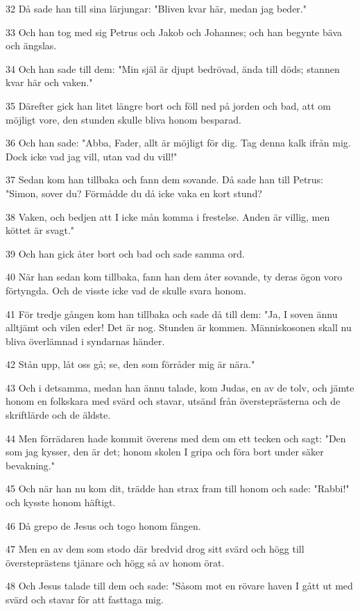 \par 32 Då sade han till sina lärjungar: "Bliven kvar här, medan jag beder."
\par 33 Och han tog med sig Petrus och Jakob och Johannes; och han begynte bäva och ängslas.
\par 34 Och han sade till dem: "Min själ är djupt bedrövad, ända till döds; stannen kvar här och vaken."
\par 35 Därefter gick han litet längre bort och föll ned på jorden och bad, att om möjligt vore, den stunden skulle bliva honom besparad.
\par 36 Och han sade: "Abba, Fader, allt är möjligt för dig. Tag denna kalk ifrån mig. Dock icke vad jag vill, utan vad du vill!"
\par 37 Sedan kom han tillbaka och fann dem sovande. Då sade han till Petrus: "Simon, sover du? Förmådde du då icke vaka en kort stund?
\par 38 Vaken, och bedjen att I icke mån komma i frestelse. Anden är villig, men köttet är svagt."
\par 39 Och han gick åter bort och bad och sade samma ord.
\par 40 När han sedan kom tillbaka, fann han dem åter sovande, ty deras ögon voro förtyngda. Och de visste icke vad de skulle svara honom.
\par 41 För tredje gången kom han tillbaka och sade då till dem: "Ja, I soven ännu alltjämt och vilen eder! Det är nog. Stunden är kommen. Människosonen skall nu bliva överlämnad i syndarnas händer.
\par 42 Stån upp, låt oss gå; se, den som förråder mig är nära."
\par 43 Och i detsamma, medan han ännu talade, kom Judas, en av de tolv, och jämte honom en folkskara med svärd och stavar, utsänd från översteprästerna och de skriftlärde och de äldste.
\par 44 Men förrädaren hade kommit överens med dem om ett tecken och sagt: "Den som jag kysser, den är det; honom skolen I gripa och föra bort under säker bevakning."
\par 45 Och när han nu kom dit, trädde han strax fram till honom och sade: "Rabbi!" och kysste honom häftigt.
\par 46 Då grepo de Jesus och togo honom fången.
\par 47 Men en av dem som stodo där bredvid drog sitt svärd och högg till översteprästens tjänare och högg så av honom örat.
\par 48 Och Jesus talade till dem och sade: "Såsom mot en rövare haven I gått ut med svärd och stavar för att fasttaga mig.
